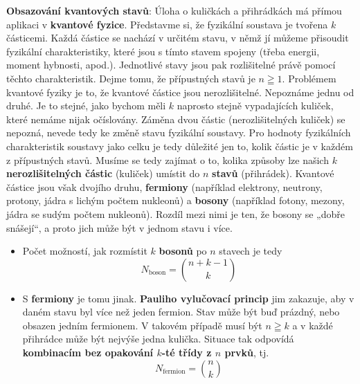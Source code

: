 \begin{mdframed}[style=mdexam]
  \begin{example}\label{mai:exam010}
    \textbf{Obsazování kvantových stavů}:\newline
    Úloha o kuličkách a přihrádkách má přímou aplikaci v \textbf{kvantové fyzice}. Představme si, že
    fyzikální soustava je tvořena \(k\) částicemi. Každá částice se nachází v určitém stavu, v němž
    jí můžeme přisoudit fyzikální charakteristiky, které jsou s tímto stavem spojeny (třeba energii,
    moment hybnosti, apod.). Jednotlivé stavy jsou pak rozlišitelné právě pomocí těchto
    charakteristik. Dejme tomu, že přípustných stavů je \(n \geqq 1\). Problémem kvantové fyziky je
    to, že kvantové částice jsou nerozlišitelné. Nepoznáme jednu od druhé. Je to stejné, jako bychom
    měli \(k\) naprosto stejně vypadajících kuliček, které nemáme nijak očíslovány. Záměna dvou
    částic (nerozlišitelných kuliček) se nepozná, nevede tedy ke změně stavu fyzikální soustavy. Pro
    hodnoty fyzikálních charakteristik soustavy jako celku je tedy důležité jen to, kolik částic je
    v každém z přípustných stavů. Musíme se tedy zajímat o to, kolika způsoby lze našich \(k\)
    \textbf{nerozlišitelných částic} (kuliček) umístit do \(n\) \textbf{stavů}
    (přihrádek). Kvantové částice jsou však dvojího druhu, \textbf{fermiony} (například elektrony,
    neutrony, protony, jádra s lichým počtem nukleonů) a \textbf{bosony} (například fotony, mezony,
    jádra se sudým počtem nukleonů). Rozdíl mezi nimi je ten, že bosony se „dobře snášejí“, a proto
    jich může být v jednom stavu i více. 
    \begin{itemize}[noitemsep]
      \item Počet možností, jak rozmístit \(k\) \textbf{bosonů} po \(n\) stavech je tedy
            \begin{equation*}
              N_{\text{boson}} = \binom{ n + k - 1}{k}
            \end{equation*}
      \item S \textbf{fermiony} je tomu jinak. \textbf{Pauliho vylučovací princip} jim zakazuje, aby
            v daném stavu byl více než jeden fermion. Stav může být buď prázdný, nebo obsazen jedním
            fermionem. V takovém případě musí být \(n \geqq k\) a v každé přihrádce může být nejvýše
            jedna kulička. Situace tak odpovídá \textbf{kombinacím bez opakování \(k\)-té třídy z
            \(n\) prvků}, tj.
            \begin{equation*}
              N_{\text{fermion}} = \binom{n}{k}
            \end{equation*}
    \end{itemize}
  \end{example}
\end{mdframed}